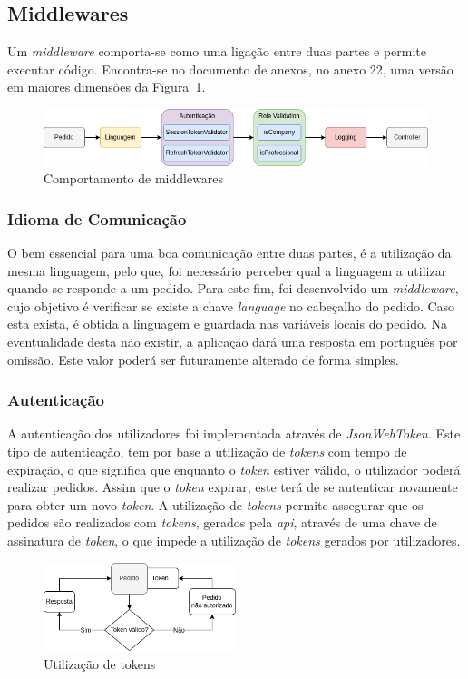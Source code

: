 \subsection{Middlewares} 
Um \textit{middleware} comporta-se como uma ligação entre duas partes e permite executar código. Encontra-se no documento de anexos, no anexo 22, uma versão em maiores dimensões da Figura~\ref*{middlewares_png}.

\begin{figure}[htb]
 \centering
 \includegraphics[width=\textwidth]{images/implementacao/api/middlewares.png}
 \caption{Comportamento de middlewares}
 \label{middlewares_png}
\end{figure}

\subsubsection{Idioma de Comunicação}\label{sec:idioma_comunicacao}
O bem essencial para uma boa comunicação entre duas partes, é a utilização da mesma linguagem, pelo que, foi necessário perceber qual a linguagem a utilizar quando se responde a um pedido. Para este fim, foi desenvolvido um \textit{middleware}, cujo objetivo é verificar se existe a chave \textit{language} no cabeçalho do pedido. Caso esta exista, é obtida a linguagem e guardada nas variáveis locais do pedido. Na eventualidade desta não existir, a aplicação dará uma resposta em português por omissão. Este valor poderá ser futuramente alterado de forma simples.

\newpage

\subsubsection{Autenticação}
A autenticação dos utilizadores foi implementada através de \textit{JsonWebToken}. Este tipo de autenticação, tem por base a utilização de \textit{tokens} com tempo de expiração, o que significa que enquanto o \textit{token} estiver válido, o utilizador poderá realizar pedidos. Assim que o \textit{token} expirar, este terá de se autenticar novamente para obter um novo \textit{token}.
A utilização de \textit{tokens} permite assegurar que os pedidos são realizados com \textit{tokens}, gerados pela \textit{\acrshort{api}}, através de uma chave de assinatura de \textit{token}, o que impede a utilização de \textit{tokens} gerados por utilizadores.
\begin{figure}[htb]
 \centering
 \includegraphics[width=0.5\textwidth]{images/implementacao/api/jwt_session.png}
 \caption{Utilização de tokens}
 \label{fig:64}
\end{figure}

